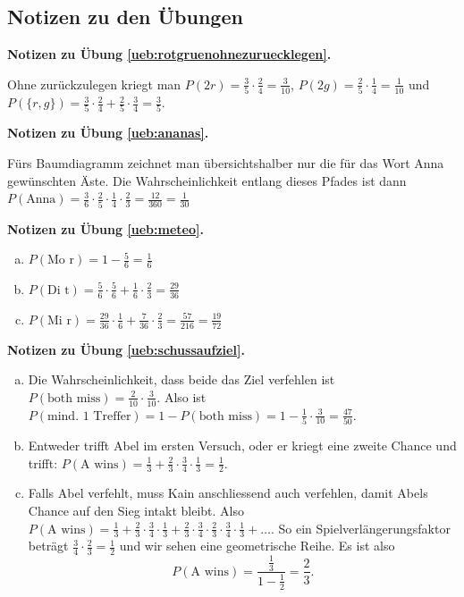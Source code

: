\documentclass[%
11pt,%
twoside,%
titlepage,%
german,%
headsepline%
]{scrartcl}
\newcommand{\concatueb}[1]{ueb:#1}%
\newcommand{\concatlsg}[1]{lsg:#1}%
\newenvironment{lsg}[1]{%
    \par\noindent\textbf{Notizen zu Übung \ref{\concatueb{#1}}.}%
    \label{\concatlsg{#1}}
}{%
    \par%
}
\begin{document}
\clearpage

\subsection{Notizen zu den \"Ubungen}

\begin{lsg}{rotgruenohnezuruecklegen}
Ohne zur\"uckzulegen kriegt man $P(2r)=\frac{3}{5}\cdot\frac{2}{4}=\frac{3}{10}$, $P(2g)=\frac{2}{5}\cdot\frac{1}{4}=\frac{1}{10}$ und $P(\{r,g\})=\frac{3}{5}\cdot\frac{2}{4}+\frac{2}{5}\cdot\frac{3}{4}=\frac{3}{5}$.
\end{lsg}

\begin{lsg}{ananas}
F\"urs Baumdiagramm zeichnet man \"ubersichtshalber nur die f\"ur das Wort Anna gew\"unschten \"Aste. Die Wahrscheinlichkeit entlang dieses Pfades ist dann $P(\text{Anna})=\frac{3}{6}\cdot\frac{2}{5}\cdot\frac{1}{4}\cdot\frac{2}{3}=\frac{12}{360}=\frac{1}{30}$
\end{lsg}

\begin{lsg}{meteo}
\begin{enumerate}[a)]
\item $P(\text{Mo r})=1-\frac{5}{6}=\frac{1}{6}$
\item $P(\text{Di t})=\frac{5}{6}\cdot\frac{5}{6}+\frac{1}{6}\cdot\frac{2}{3}=\frac{29}{36}$
\item $P(\text{Mi r})=\frac{29}{36}\cdot\frac{1}{6}+\frac{7}{36}\cdot\frac{2}{3}=\frac{57}{216}=\frac{19}{72}$
\end{enumerate}
\end{lsg}

\begin{lsg}{schussaufziel}
\begin{enumerate}[a)]
\item Die Wahrscheinlichkeit, dass beide das Ziel verfehlen ist $P(\text{both miss})=\frac{2}{10}\cdot\frac{3}{10}$. Also ist $P(\text{mind. 1 Treffer})=1-P(\text{both miss})=1-\frac{1}{5}\cdot\frac{3}{10}=\frac{47}{50}$.
\item Entweder trifft Abel im ersten Versuch, oder er kriegt eine zweite Chance und trifft: $P(\text{A wins})=\frac{1}{3}+\frac{2}{3}\cdot\frac{3}{4}\cdot\frac{1}{3}=\frac{1}{2}$.
\item Falls Abel verfehlt, muss Kain anschliessend auch verfehlen, damit Abels Chance auf den Sieg intakt bleibt. Also $P(\text{A wins})=\frac{1}{3}+\frac{2}{3}\cdot\frac{3}{4}\cdot\frac{1}{3}+\frac{2}{3}\cdot\frac{3}{4}\cdot\frac{2}{3}\cdot\frac{3}{4}\cdot\frac{1}{3}+\dots$. So ein \glqq Spielverl\"angerungsfaktor betr\"agt $\frac{3}{4}\cdot\frac{2}{3}=\frac{1}{2}$ und wir sehen eine geometrische Reihe. Es ist also
$$P(\text{A wins})=\frac{\frac{1}{3}}{1-\frac{1}{2}}=\frac{2}{3}.$$
\end{enumerate}
\end{lsg}
\end{document}

